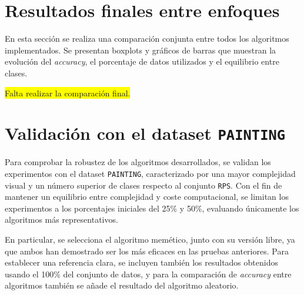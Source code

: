 \section{Resultados finales entre enfoques}\label{sec:comparacion-final-enfoques}
En esta sección se realiza una comparación conjunta entre todos los algoritmos implementados.
Se presentan boxplots y gráficos de barras que muestran la evolución del \textit{accuracy}, el porcentaje de datos utilizados y el equilibrio entre clases.


\colorbox{yellow}{Falta realizar la comparación final.}


\section{Validación con el dataset \texttt{PAINTING}}\label{sec:validacion-con-painting}
Para comprobar la robustez de los algoritmos desarrollados, se validan los experimentos con el dataset \texttt{PAINTING},
caracterizado por una mayor complejidad visual y un número superior de clases respecto al conjunto \texttt{RPS}.
Con el fin de mantener un equilibrio entre complejidad y coste computacional, se limitan los experimentos a los porcentajes iniciales del 25\% y 50\%,
evaluando únicamente los algoritmos más representativos.

En particular, se selecciona el algoritmo memético, junto con su versión libre, ya que ambos han demostrado ser los más eficaces en las pruebas anteriores.
Para establecer una referencia clara, se incluyen también los resultados obtenidos usando el 100\% del conjunto de datos, y para la comparación de
\textit{accuracy} entre algoritmos también se añade el resultado del algoritmo aleatorio.

